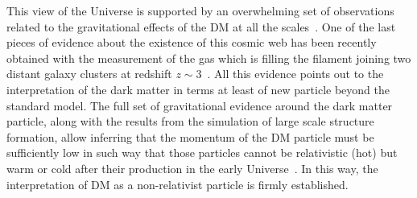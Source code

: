\documentclass[a4paper,10pt,epsfig,epsf,amsfonts,amsmath]{article}
\begin{document}
\begin{old}
This view of the Universe is
supported by an overwhelming set of observations related to the
gravitational effects of the DM at all the
scales~\cite{Buckley:2017ijx}.
One of the last pieces of evidence about the existence of this cosmic
web has been recently obtained with the measurement of the gas which
is filling the filament joining two distant galaxy clusters at 
redshift $z\sim 3$~\cite{Umehata2019}.
All this evidence points out to the interpretation
of the dark matter in terms at least of new particle
beyond the standard model.
The full set of gravitational evidence around the dark matter
particle, along with the results from the simulation of large scale
structure formation, allow inferring that the momentum of the DM
particle must be sufficiently low in such way that those particles
cannot be relativistic (hot) but warm or cold after their production
in the early Universe~\cite{Aghanim:2018eyx}.  In this way, the
interpretation of DM as a non-relativist particle is firmly
established.


\end{old}
\end{document}
